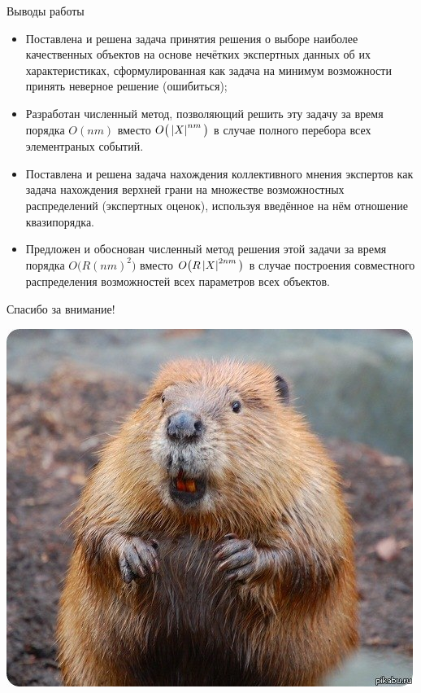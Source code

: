 
\begin{frame}{Выводы работы}
	\begin{itemize}
	 \item 
	 Поставлена и решена задача принятия решения о выборе наиболее качественных объектов на основе нечётких экспертных данных об их характеристиках, сформулированная как задача на минимум возможности принять неверное 
	 решение (ошибиться);	
	\item 
	Разработан численный метод, позволяющий решить эту задачу за время порядка $O(nm)$ вместо $O\big(\left| X \right|^{nm}\big)$ в случае полного перебора всех элементраных событий. %
	\item
	Поставлена и решена задача нахождения коллективного мнения экспертов как задача нахождения верхней грани на множестве возможностных распределений (экспертных оценок), используя введённое на нём отношение квазипорядка.
	\item
	Предложен и обоснован численный метод решения этой задачи за время порядка $O\big(R(nm)^2\big)$ вместо $O\big(R\left| X \right|^{2nm}\big)$ в случае построения совместного распределения возможностей всех параметров всех объектов. %
      \end{itemize}
\end{frame} %

		

\begin{frame}{Спасибо за внимание!}
	\begin{center}
		\includegraphics[width=0.5\linewidth]{./pic/biber_final}
	\end{center}
\end{frame}

